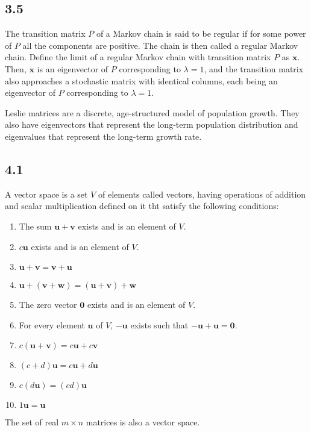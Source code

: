 \documentclass{article}
\begin{document}
    \subsection*{3.5}
    The transition matrix $P$ of a Markov chain is said to be regular if for some power of $P$ all the
    components are positive. 
    The chain is then called a regular Markov chain.
    Define the limit of a regular Markov chain with transition matrix $P$ as $\mathbf{x}$. 
    Then, $\mathbf{x}$ is an eigenvector of $P$ corresponding to $\lambda = 1$,
    and the transition matrix also approaches a stochastic matrix with identical columns,
    each being an eigenvector of $P$ corresponding to $\lambda = 1$.
    
    Leslie matrices are a discrete, age-structured model of population growth.
    They also have eigenvectors that represent the long-term population distribution
    and eigenvalues that represent the long-term growth rate.

    \subsection*{4.1}
    A vector space is a set $V$ of elements called vectors,
    having operations of addition and scalar multiplication
    defined on it tht satisfy the following conditions:
    \begin{enumerate}
        \item The sum $\mathbf{u} + \mathbf{v}$ exists and is an element of $V$.
        \item $c \mathbf{u}$ exists and is an element of $V$.
        \item $\mathbf{u} + \mathbf{v} = \mathbf{v} + \mathbf{u}$
        \item $\mathbf{u} + (\mathbf{v} + \mathbf{w}) = (\mathbf{u} + \mathbf{v}) + \mathbf{w}$
        \item The zero vector $\mathbf{0}$ exists and is an element of $V$.
        \item For every element $\mathbf{u}$ of $V$, $\mathbf{-u}$ exists such that $\mathbf{-u} + \mathbf{u} = \mathbf{0}$.
        \item $c(\mathbf{u} + \mathbf{v}) = c\mathbf{u} + c\mathbf{v}$
        \item $(c + d)\mathbf{u} = c\mathbf{u} + d\mathbf{u}$
        \item $c(d \mathbf{u}) = (cd)\mathbf{u}$
        \item $1\mathbf{u} = \mathbf{u}$
    \end{enumerate}
    The set of real $m \times n$ matrices is also a vector space.
\end{document}
